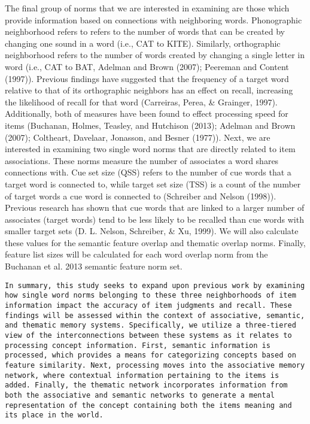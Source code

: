 \documentclass[english,man]{apa6}
\theoremstyle{definition}
\theoremstyle{definition}
\theoremstyle{definition}
\theoremstyle{remark}
\begin{document}
The final group of norms that we are interested in examining are those
which provide information based on connections with neighboring words.
Phonographic neighborhood refers to refers to the number of words that
can be created by changing one sound in a word (i.e., CAT to KITE).
Similarly, orthographic neighborhood refers to the number of words
created by changing a single letter in word (i.e., CAT to BAT, Adelman
and Brown (2007); Peereman and Content (1997)). Previous findings have
suggested that the frequency of a target word relative to that of its
orthographic neighbors has an effect on recall, increasing the
likelihood of recall for that word (Carreiras, Perea, \& Grainger,
1997). Additionally, both of measures have been found to effect
processing speed for items (Buchanan, Holmes, Teasley, and Hutchison
(2013); Adelman and Brown (2007); Coltheart, Davelaar, Jonasson, and
Besner (1977)). Next, we are interested in examining two single word
norms that are directly related to item associations. These norms
measure the number of associates a word shares connections with. Cue set
size (QSS) refers to the number of cue words that a target word is
connected to, while target set size (TSS) is a count of the number of
target words a cue word is connected to (Schreiber and Nelson (1998)).
Previous research has shown that cue words that are linked to a larger
number of associates (target words) tend to be less likely to be
recalled than cue words with smaller target sets (D. L. Nelson,
Schreiber, \& Xu, 1999). We will also calculate these values for the
semantic feature overlap and thematic overlap norms. Finally, feature
list sizes will be calculated for each word overlap norm from the
Buchanan et al. 2013 semantic feature norm set.

\begin{verbatim}
In summary, this study seeks to expand upon previous work by examining how single word norms belonging to these three neighborhoods of item information impact the accuracy of item judgments and recall. These findings will be assessed within the context of associative, semantic, and thematic memory systems. Specifically, we utilize a three-tiered view of the interconnections between these systems as it relates to processing concept information. First, semantic information is processed, which provides a means for categorizing concepts based on feature similarity. Next, processing moves into the associative memory network, where contextual information pertaining to the items is added. Finally, the thematic network incorporates information from both the associative and semantic networks to generate a mental representation of the concept containing both the items meaning and its place in the world.
\end{verbatim}
\end{document}
